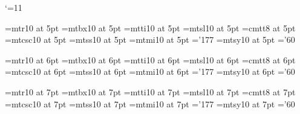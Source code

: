 %
%
%
%

\catcode `\@=11 %

\def\@version{1.6}
\def\@verdate{18th September 1995}


%
%


\newif\ifprod@font

\ifx\@typeface\undefined
  \def\@typeface{Comp. Modern}\prod@fontfalse
\else
  \prod@fonttrue %
\fi

\def\newfam{\alloc@8\fam\chardef\sixt@@n} %

\ifprod@font
%
\font\fiverm=mtr10 at 5pt
\font\fivebf=mtbx10 at 5pt
\font\fiveit=mtti10 at 5pt
\font\fivesl=mtsl10 at 5pt
\font\fivett=cmtt8 at 5pt     \hyphenchar{}
\font\fivecsc=mtcsc10 at 5pt
\font\fivesf=mtss10 at 5pt
\font\fivei=mtmi10 at 5pt      \skewchar\fivei='177
\font\fivesy=mtsy10 at 5pt     \skewchar\fivesy='60

\font\sixrm=mtr10 at 6pt
\font\sixbf=mtbx10 at 6pt
\font\sixit=mtti10 at 6pt
\font\sixsl=mtsl10 at 6pt
\font\sixtt=cmtt8 at 6pt      \hyphenchar{}
\font\sixcsc=mtcsc10 at 6pt
\font\sixsf=mtss10 at 6pt
\font\sixi=mtmi10 at 6pt       \skewchar\sixi='177
\font\sixsy=mtsy10 at 6pt      \skewchar\sixsy='60

\font\sevenrm=mtr10 at 7pt
\font\sevenbf=mtbx10 at 7pt
\font\sevenit=mtti10 at 7pt
\font\sevensl=mtsl10 at 7pt
\font\seventt=cmtt8 at 7pt     \hyphenchar{}
\font\sevencsc=mtcsc10 at 7pt
\font\sevensf=mtss10 at 7pt
\font\seveni=mtmi10 at 7pt      \skewchar\seveni='177
\font\sevensy=mtsy10 at 7pt     \skewchar\sevensy='60

